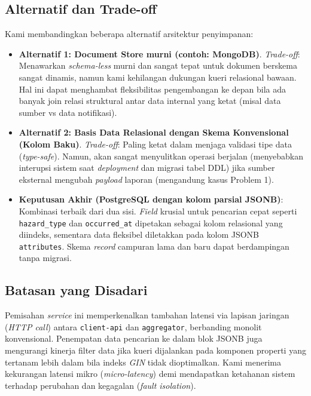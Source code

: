 \subsection{Alternatif dan Trade-off}
Kami membandingkan beberapa alternatif arsitektur penyimpanan:
\begin{itemize}
    \item \textbf{Alternatif 1: Document Store murni (contoh: MongoDB)}. \textit{Trade-off}: Menawarkan \textit{schema-less} murni dan sangat tepat untuk dokumen berskema sangat dinamis, namun kami kehilangan dukungan kueri relasional bawaan. Hal ini dapat menghambat fleksibilitas pengembangan ke depan bila ada banyak join relasi struktural antar data internal yang ketat (misal data sumber vs data notifikasi).
    \item \textbf{Alternatif 2: Basis Data Relasional dengan Skema Konvensional (Kolom Baku)}. \textit{Trade-off}: Paling ketat dalam menjaga validasi tipe data (\textit{type-safe}). Namun, akan sangat menyulitkan operasi berjalan (menyebabkan interupsi sistem saat \textit{deployment} dan migrasi tabel DDL) jika sumber eksternal mengubah \textit{payload} laporan (mengandung kasus Problem 1).
    \item \textbf{Keputusan Akhir (PostgreSQL dengan kolom parsial JSONB)}: Kombinasi terbaik dari dua sisi. \textit{Field} krusial untuk pencarian cepat seperti \texttt{hazard\_type} dan \texttt{occurred\_at} dipetakan sebagai kolom relasional yang diindeks, sementara data fleksibel diletakkan pada kolom JSONB \texttt{attributes}. Skema \textit{record} campuran lama dan baru dapat berdampingan tanpa migrasi.
\end{itemize}

\subsection{Batasan yang Disadari}
Pemisahan \textit{service} ini memperkenalkan tambahan latensi via lapisan jaringan (\textit{HTTP call}) antara \texttt{client-api} dan \texttt{aggregator}, berbanding monolit konvensional. Penempatan data pencarian ke dalam blok JSONB juga mengurangi kinerja filter data jika kueri dijalankan pada komponen properti yang tertanam lebih dalam bila indeks \textit{GIN} tidak dioptimalkan. Kami menerima kekurangan latensi mikro (\textit{micro-latency}) demi mendapatkan ketahanan sistem terhadap perubahan dan kegagalan (\textit{fault isolation}).

